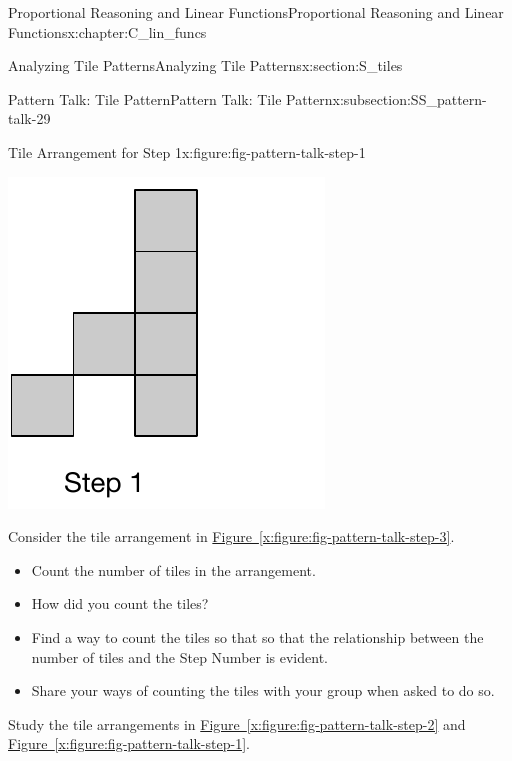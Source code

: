 \documentclass[oneside,10pt,]{book}
\newcommand{\xreffont}{\relax}
\numberwithin{equation}{chapter}
\begin{document}
\begin{chapterptx}{Proportional Reasoning and Linear Functions}{}{Proportional Reasoning and Linear Functions}{}{}{x:chapter:C_lin_funcs}
\begin{sectionptx}{Analyzing Tile Patterns}{}{Analyzing Tile Patterns}{}{}{x:section:S_tiles}
\begin{subsectionptx}{Pattern Talk: Tile Pattern}{}{Pattern Talk: Tile Pattern}{}{}{x:subsection:SS_pattern-talk-29}
\begin{figureptx}{Tile Arrangement for Step 1}{x:figure:fig-pattern-talk-step-1}{}
\begin{image}{0.25}{0.5}{0.25}
\includegraphics[width=\linewidth]{external/pattern-talk-step-1.pdf}
\end{image}%
\tcblower
\end{figureptx}%
Consider the tile arrangement in \hyperref[x:figure:fig-pattern-talk-step-3]{Figure~{\xreffont\ref{x:figure:fig-pattern-talk-step-3}}}.%
\begin{itemize}[label=\textbullet]
\item{}Count the number of tiles in the arrangement.%
\item{}How did you count the tiles?%
\item{}Find a way to count the tiles so that so that the relationship between the number of tiles and the Step Number is evident.%
\item{}Share your ways of counting the tiles with your group when asked to do so.%
\end{itemize}
%
\par
Study the tile arrangements in \hyperref[x:figure:fig-pattern-talk-step-2]{Figure~{\xreffont\ref{x:figure:fig-pattern-talk-step-2}}} and \hyperref[x:figure:fig-pattern-talk-step-1]{Figure~{\xreffont\ref{x:figure:fig-pattern-talk-step-1}}}.%
\begin{itemize}[label=\textbullet]

\end{itemize}
\end{subsectionptx}
\end{sectionptx}
\end{chapterptx}
\end{document}
